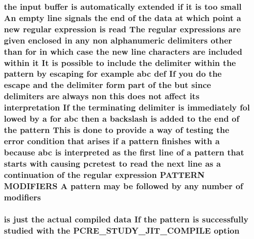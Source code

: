 \subsubsection[{\texorpdfstring{modifiers}{modifiers}}]{\setlength{\rightskip}{0pt plus 5cm}the {\bf input} {\bf buffer} {\bf is} automatically extended {\bf if} {\bf it} {\bf is} too small An {\bf empty} {\bf line} signals the {\bf end} {\bf of} the {\bf data} at {\bf which} {\bf point} {\bf a} new regular {\bf expression} {\bf is} {\bf read} The regular {\bf expressions} {\bf are} {\bf given} enclosed {\bf in} {\bf any} non {\bf alphanumeric} delimiters other {\bf than} for {\bf in} {\bf which} {\bf case} the new {\bf line} {\bf characters} {\bf are} {\bf included} within {\bf it} It {\bf is} {\bf possible} {\bf to} {\bf include} the delimiter within the {\bf pattern} by escaping for {\bf example} {\bf abc} def If you {\bf do} the escape and the delimiter form part {\bf of} the but since delimiters {\bf are} always non {\bf this} does {\bf not} affect its interpretation If the terminating delimiter {\bf is} immediately fol lowed by {\bf a} for {\bf abc} then {\bf a} {\bf backslash} {\bf is} added {\bf to} the {\bf end} {\bf of} the {\bf pattern} This {\bf is} {\bf done} {\bf to} provide {\bf a} {\bf way} {\bf of} testing the {\bf error} condition that {\bf arises} {\bf if} {\bf a} {\bf pattern} finishes {\bf with} {\bf a} because {\bf abc} {\bf is} interpreted {\bf as} the {\bf first} {\bf line} {\bf of} {\bf a} {\bf pattern} that starts {\bf with} causing {\bf pcretest} {\bf to} {\bf read} the next {\bf line} {\bf as} {\bf a} continuation {\bf of} the regular {\bf expression} P\+A\+T\+T\+E\+RN M\+O\+D\+I\+F\+I\+E\+RS {\bf A} {\bf pattern} may {\bf be} followed by {\bf any} {\bf number} {\bf of} modifiers}\hypertarget{pcretest_8txt_a044122125817512d39145a8669263c4f}{}\label{pcretest_8txt_a044122125817512d39145a8669263c4f}
\subsubsection[{\texorpdfstring{option}{option}}]{ {\bf is} just the actual {\bf compiled} {\bf data} If the {\bf pattern} {\bf is} successfully {\bf studied} {\bf with} the {\bf P\+C\+R\+E\+\_\+\+S\+T\+U\+D\+Y\+\_\+\+J\+I\+T\+\_\+\+C\+O\+M\+P\+I\+LE} option}\hypertarget{pcretest_8txt_a737bdf2e23a8aca3ce89e79e9df35b3e}{}\label{pcretest_8txt_a737bdf2e23a8aca3ce89e79e9df35b3e}

